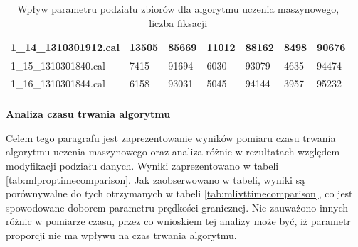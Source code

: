 {\begin{longtable}{l|l|l|l|l|l|l|}
    \multicolumn{1}{|l|}{1\_14\_1310301912.cal} & 13505 & \cellcolor[HTML]{EFEFEF}85669 & 11012 & \cellcolor[HTML]{EFEFEF}88162 & 8498 & \cellcolor[HTML]{EFEFEF}90676 \\ \hline
    \multicolumn{1}{|l|}{1\_15\_1310301840.cal} & 7415 & \cellcolor[HTML]{EFEFEF}91694 & 6030 & \cellcolor[HTML]{EFEFEF}93079 & 4635 & \cellcolor[HTML]{EFEFEF}94474 \\ \hline
    \multicolumn{1}{|l|}{1\_16\_1310301844.cal} & 6158 & \cellcolor[HTML]{EFEFEF}93031 & 5045 & \cellcolor[HTML]{EFEFEF}94144 & 3957 & \cellcolor[HTML]{EFEFEF}95232 \\ \hline
    \caption{Wpływ parametru podziału zbiorów dla algorytmu uczenia maszynowego, liczba fiksacji}
    \label{tab:mlpropfixcomparison}\\
\end{longtable}
}
\textbf{Analiza czasu trwania algorytmu}\par
Celem tego paragrafu jest zaprezentowanie wyników pomiaru czasu trwania algorytmu uczenia maszynowego oraz analiza różnic w rezultatach względem modyfikacji podziału danych. Wyniki zaprezentowano w tabeli \ref{tab:mlproptimecomparison}. Jak zaobserwowano w tabeli, wyniki są porównywalne do tych otrzymanych w tabeli \ref{tab:mlivttimecomparison}, co jest spowodowane doborem parametru prędkości granicznej. Nie zauważono innych różnic w pomiarze czasu, przez co wnioskiem tej analizy może być, iż parametr proporcji nie ma wpływu na czas trwania algorytmu.\par

